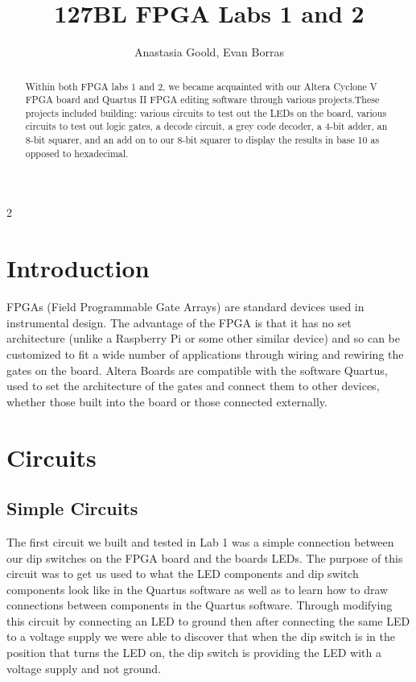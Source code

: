 \documentclass[a4paper]{article}
\title{127BL FPGA Labs 1 and 2}
\author{Anastasia Goold, Evan Borras}
\begin{document}
\maketitle
\begin{multicols}{2}
\setlength{\parskip}{0.1in}
\setlength{\parindent}{15pt}

\begin{abstract}
Within both FPGA labs 1 and 2, we became acquainted with our Altera Cyclone V FPGA board and Quartus II FPGA editing software through various projects.These projects included building: various circuits to test out the LEDs on the board, various circuits to test out logic gates, a decode circuit, a grey code decoder, a 4-bit adder, an 8-bit squarer, and an add on to our 8-bit squarer to display the results in base 10 as opposed to hexadecimal. 
\end{abstract}

\section{Introduction}
FPGAs (Field Programmable Gate Arrays) are standard devices used in instrumental design. The advantage of the FPGA is that it has no set architecture (unlike a Raspberry Pi or some other similar device) and so can be customized to fit a wide number of applications through wiring and rewiring the gates on the board. Altera Boards are compatible with the software Quartus, used to set the architecture of the gates and connect them to other devices, whether those built into the board or those connected externally.

\section{Circuits}

\subsection{Simple Circuits}
The first circuit we built and tested in Lab 1 was a simple connection between our dip switches on the FPGA board and the boards LEDs. The purpose of this circuit was to get us used to what the LED components and dip switch components look like in the Quartus software as well as to learn how to draw connections between components in the Quartus software. Through modifying this circuit by connecting an LED to ground then after connecting the same LED to a voltage supply we were able to discover that when the dip switch is in the position that turns the LED on, the dip switch is providing the LED with a voltage supply and not ground. 


\end{multicols}
\end{document}

